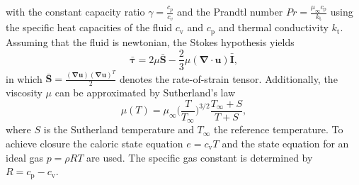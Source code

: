 \documentclass[11pt,a4paper,openany,oneside,parskip=half*]{article}
\renewcommand*\vec[1]{\boldsymbol{#1}}
\renewcommand*\matrix[1]{\boldsymbol{#1}}
\begin{document}
with the constant capacity ratio $\gamma = \frac{c_p}{c_v}$ and the Prandtl number
$ Pr = \frac{\mu_\infty c_\mathrm{p}}{k_\mathrm{t}}$
using the specific heat capacities of the fluid $ c_\mathrm{v} $ and $ c_\mathrm{p} $ and thermal conductivity $k_\mathrm{t}$.
Assuming that the fluid is newtonian, the Stokes hypothesis yields
\begin{equation}
 \matrix{\bar{\tau}} = 2 \mu \matrix{\bar{S}} - \frac{2}{3} \mu (\vec\nabla \cdot \vec{u}) \matrix{\bar{I}},
\end{equation}
in which $ \matrix{\bar{S}} = \frac{(\vec\nabla \vec{u})(\vec\nabla \vec{u})^T}{2} $ denotes the rate-of-strain tensor. Additionally, the viscosity
$ \mu $ can be approximated by Sutherland's law
\begin{equation}
 \mu (T) = \mu_\infty \biggl(\frac{T}{T_\infty}\biggl)^{3/2} \frac{T_\infty + S}{T + S},
\end{equation}
where $S$ is the Sutherland temperature and $T_\infty$ the reference temperature.
To achieve closure the caloric state equation $ e = c_\mathrm{v} T $ and the state equation for an ideal gas $
p = \rho R T $ are used. The specific gas constant is determined by $ R = c_\mathrm{p} - c_\mathrm{v} $. 
\newline
\end{document}
